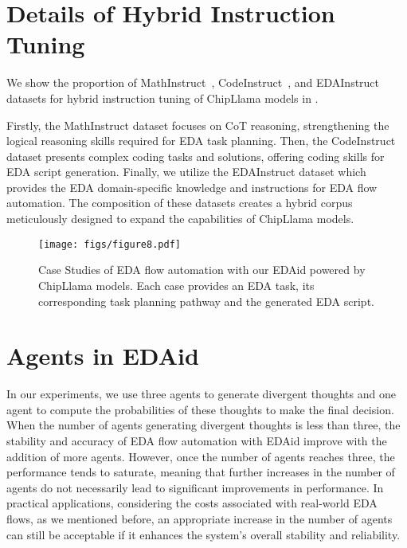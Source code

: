 \section{Details of Hybrid Instruction Tuning}

\label{sec:appendix1}
We show the proportion of MathInstruct~\cite{yu2023metamath}, CodeInstruct~\cite{wei2023magicoder}, and EDAInstruct~\cite{wu2024chateda} datasets for hybrid instruction tuning of ChipLlama models in .

Firstly, the MathInstruct dataset focuses on CoT reasoning, strengthening the logical reasoning skills required for EDA task planning. 
Then, the  CodeInstruct dataset presents complex coding tasks and solutions, offering coding skills for EDA script generation. 
Finally, we utilize the EDAInstruct dataset which provides the EDA domain-specific knowledge and instructions for EDA flow automation.
The composition of these datasets creates a hybrid corpus meticulously designed to expand the capabilities of ChipLlama models. 

\begin{table}[!htbp]
\centering
{}
\caption{The proportion of MathInstruct, CodeInstruct and EDAInstruct datasets for hybrid instruction tuning.}
\label{table:datasets}
\end{table}

\begin{figure*}[!tb]
    \centering
    \texttt{[image: figs/figure8.pdf]} 
    \caption{Case Studies of EDA flow automation with our EDAid powered by ChipLlama models. Each case provides an EDA task, its corresponding task planning pathway and the generated EDA script.}
    \label{fig:cases}
\end{figure*}

\section{Agents in EDAid}
\label{sec:appendix2}
In our experiments, we use three agents to generate divergent thoughts and one agent to compute the probabilities of these thoughts to make the final decision. 
When the number of agents generating divergent thoughts is less than three, the stability and accuracy of EDA flow automation with EDAid improve with the addition of more agents. 
However, once the number of agents reaches three, the performance tends to saturate, meaning that further increases in the number of agents do not necessarily lead to significant improvements in performance. 
In practical applications, considering the costs associated with real-world EDA flows, as we mentioned before, an appropriate increase in the number of agents can still be acceptable if it enhances the system's overall stability and reliability.

